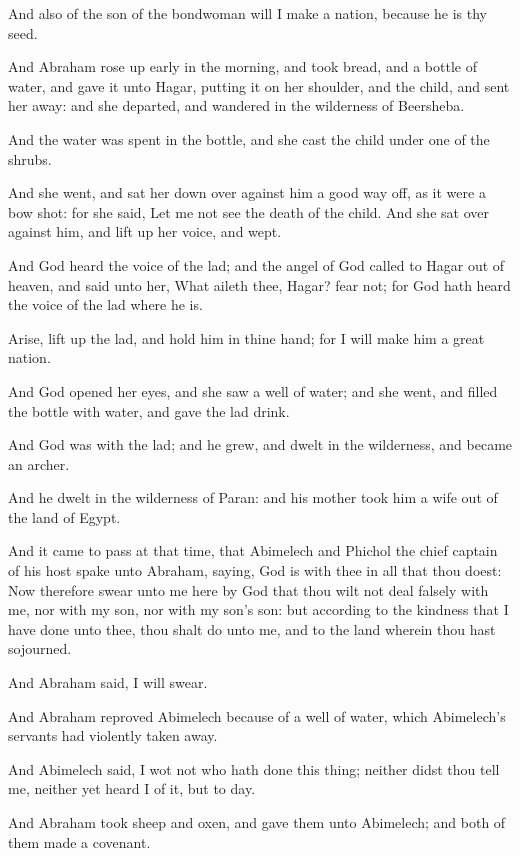 \verse And also of the son of the bondwoman will I make a nation,
because he is thy seed.

\verse And Abraham rose up early in the morning, and took bread, and a
bottle of water, and gave it unto Hagar, putting it on her shoulder,
and the child, and sent her away: and she departed, and wandered in
the wilderness of Beersheba.

\verse And the water was spent in the bottle, and she cast the child
under one of the shrubs.

\verse And she went, and sat her down over against him a good way off,
as it were a bow shot: for she said, Let me not see the death of the
child. And she sat over against him, and lift up her voice, and wept.

\verse And God heard the voice of the lad; and the angel of God called
to Hagar out of heaven, and said unto her, What aileth thee, Hagar?
fear not; for God hath heard the voice of the lad where he is.

\verse Arise, lift up the lad, and hold him in thine hand; for I will
make him a great nation.

\verse And God opened her eyes, and she saw a well of water; and she
went, and filled the bottle with water, and gave the lad drink.

\verse And God was with the lad; and he grew, and dwelt in the
wilderness, and became an archer.

\verse And he dwelt in the wilderness of Paran: and his mother took him
a wife out of the land of Egypt.

\verse And it came to pass at that time, that Abimelech and Phichol the
chief captain of his host spake unto Abraham, saying, God is with thee
in all that thou doest: \verse Now therefore swear unto me here by God
that thou wilt not deal falsely with me, nor with my son, nor with my
son's son: but according to the kindness that I have done unto thee,
thou shalt do unto me, and to the land wherein thou hast sojourned.

\verse And Abraham said, I will swear.

\verse And Abraham reproved Abimelech because of a well of water, which
Abimelech's servants had violently taken away.

\verse And Abimelech said, I wot not who hath done this thing; neither
didst thou tell me, neither yet heard I of it, but to day.

\verse And Abraham took sheep and oxen, and gave them unto Abimelech;
and both of them made a covenant.

